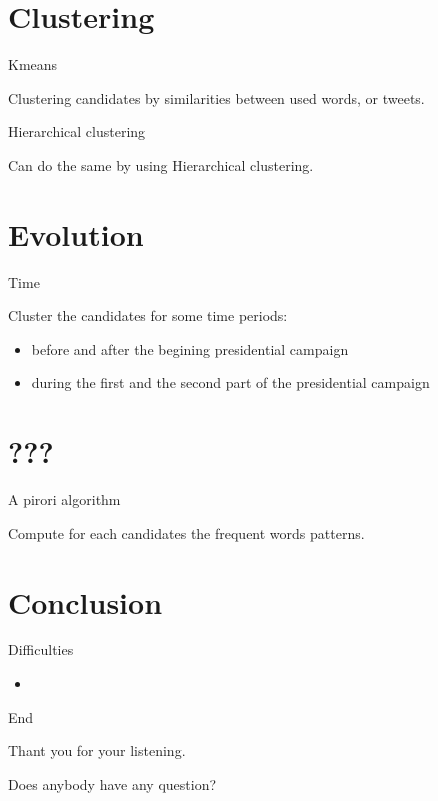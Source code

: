\documentclass{beamer}
\begin{document}
\section{Clustering}
\begin{frame}{Kmeans}
\begin{block}{}
Clustering candidates by similarities between used words, or tweets.
\end{block}
\end{frame}

\begin{frame}{Hierarchical clustering}
\begin{block}{}
Can do the same by using Hierarchical clustering.
\end{block}
\end{frame}

\section{Evolution}
\begin{frame}{Time}
\begin{block}{}
Cluster the candidates for some time periods:
\begin{itemize}
\item before and after the begining presidential campaign
\item during the first and the second part of the presidential campaign
\end{itemize}
\end{block}
\end{frame}

\section{???}
\begin{frame}{A pirori algorithm}
\begin{block}{}
Compute for each candidates the frequent words patterns. 

\end{block}
\end{frame}

\section{Conclusion}
\begin{frame}{Difficulties}
\begin{block}{}
\begin{itemize}
\item 
\end{itemize}
\end{block}
\end{frame}

\begin{frame}{End}
\begin{center}
Thant you for your listening. 


\bigskip
Does anybody have any question?
\end{center}
\end{frame}
 
\end{document}
